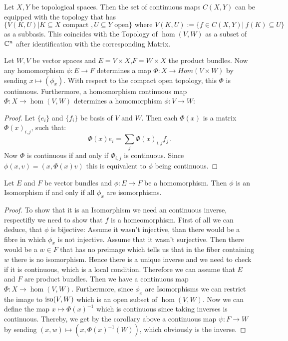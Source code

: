 \begin{definition}
	Let $X,Y$ be topological spaces. Then the set of continuous maps $C(X,Y)$ can be equipped with the topology that has 
	\begin{equation*}
		\{V(K,U)|K\subseteq X \text{ compact }, U\subseteq Y \text{ open}\} \text{ where }V(K,U):=\{f\in C(X,Y) |~f(K)\subseteq U\}
	\end{equation*} as a subbasis. This coincides with the Topology of $\hom(V,W)$ as a subset of $\mathbb{C}^n$ after identification with the corresponding Matrix.
\end{definition}
\begin{definition}\label{def: Homomorphism Bundle}
	Let $W,V$ be vector spaces and $E=V\times X$,$F=W\times X$ the product bundles. Now any homomorphism $\phi:E\to F$ determines a map $\Phi:X\to Hom(V\times W)$ by sending $x\mapsto (\phi_x)$. With respect to the compact open topology, this $\Phi$ is continuous. Furthermore, a homomorphism continuous map $\Phi:X \to \hom(V,W)$ determines a homomorphism $\phi:V\to W$:
\end{definition}
\begin{proof}
	Let $\{e_i\}$ and $\{f_i\}$ be basis of $V$ and $W$. Then each $\Phi(x)$ is a matrix $\Phi(x)_{i,j}$, such that:
	\begin{equation*}
		\Phi(x)e_i=\sum_j\Phi(x)_{i,j}f_j\,.
	\end{equation*} Now $\Phi$ is continuous if and only if $\Phi_{i,j}$ is continuous. Since $\phi(x,v)=(x,\Phi(x)v)$ this is equivalent to $\phi$ being continuous. 
\end{proof}
\begin{theorem}\label{thm: Isomorphic vector-bundles}
	Let $E$ and $F$ be vector bundles and $\phi:E\to F$ be a homomorphism. Then $\phi$ is an Isomorphism if and only if all $\phi_x$ are isomorphisms. 
\end{theorem}
\begin{proof}
	To show that it is an Isomorphism we need an continuous inverse, respectifly we need to show that $f$ is a homeomorphism. First of all we can deduce, that $\phi$ is bijective:
	Assume it wasn't injective, than there would be a fibre in which $\phi_x$ is not injective. Assume that it wasn't surjective. Then there would be a $w\in F$ that has no preimage which tells us that in the fiber containing $w$ there is no isomorphism. Hence there is a unique inverse and we need to check if it is continuous, which is a local condition. Therefore we can assume that $E$ and $F$ are product bundles. Then we have a continuous map $\Phi:X\to \hom(V,W)$. Furthermore, since $\phi_x$ are Isomorphisms we can restrict the image to $\mathrm{iso}(V,W)$ which is an open subset of $\hom(V,W)$. Now we can define the map $x\mapsto \Phi(x)^{-1}$ which is continuous since taking inverses is continuous. Thereby, we get by the corollary above a continuous map $\psi:F\to W$ by sending $(x,w)\mapsto (x,\Phi(x)^{-1}(W))$, which obviously is the inverse. 
\end{proof}



